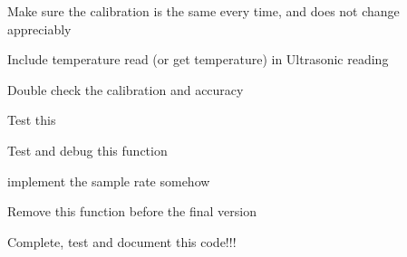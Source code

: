 \begin{DoxyRefList}
Make sure the calibration is the same every time, and does not change appreciably  
\item[\label{todo__todo000011}%
\hypertarget{todo__todo000011}{}%
Global \hyperlink{Range_8c_af470fd0f0b96399b344f11783b4ef7f3}{range\+U\+S} (unsigned char temp)]Include temperature read (or get temperature) in Ultrasonic reading 

Double check the calibration and accuracy  
\item[\label{todo__todo000008}%
\hypertarget{todo__todo000008}{}%
Global \hyperlink{PanTilt_8h_a251ee95d75c68e21c4bb933ac99e5108}{raw\+Dir} (void)]Test this  
\item[\label{todo__todo000016}%
\hypertarget{todo__todo000016}{}%
Global \hyperlink{Temp_8h_a4946ccbc1990e831667bffded1147c4f}{read\+Tempx2} (void)]Test and debug this function  
\item[\label{todo__todo000015}%
\hypertarget{todo__todo000015}{}%
Global \hyperlink{Range_8c_ae7948eddefd58fbe1509d2bade4cd908}{sample\+I\+R} (char num\+Samples)]implement the sample rate somehow  
\item[\label{todo__todo000004}%
\hypertarget{todo__todo000004}{}%
Global \hyperlink{newmain_8c_a562b6fc99e2386f66e66353386d80212}{trans\+Range} (void)]Remove this function before the final version  
\item[\label{todo__todo000002}%
\hypertarget{todo__todo000002}{}%
Global \hyperlink{Menusystem_8c_a667b04d7fb6ef46db4da4af554c5b6f7}{width} ]Complete, test and document this code!!!
\end{DoxyRefList}